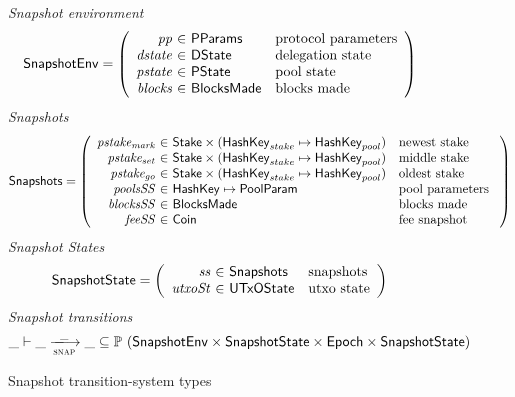 \begin{figure}[htb]
  \emph{Snapshot environment}
  \begin{equation*}
    \SnapshotEnv =
    \left(
      \begin{array}{r@{~\in~}ll}
        \var{pp} & \PParams & \text{protocol parameters}\\
        \var{dstate} & \DState & \text{delegation state}\\
        \var{pstate} & \PState & \text{pool state}\\
        \var{blocks} & \BlocksMade & \text{blocks made}\\
      \end{array}
    \right)
  \end{equation*}
  \emph{Snapshots}
  \begin{equation*}
    \Snapshots =
    \left(
      \begin{array}{r@{~\in~}ll}
        \var{pstake_{mark}} & \Stake\times(\HashKey_{stake}\mapsto\HashKey_{pool})
                            & \text{newest stake}\\
        \var{pstake_{set}} & \Stake\times(\HashKey_{stake}\mapsto\HashKey_{pool})
                           & \text{middle stake}\\
        \var{pstake_{go}} & \Stake\times(\HashKey_{stake}\mapsto\HashKey_{pool})
                          & \text{oldest stake}\\
        \var{poolsSS} & \HashKey \mapsto \PoolParam & \text{pool parameters }\\
        \var{blocksSS} & \BlocksMade & \text{blocks made }\\
        \var{feeSS} & \Coin & \text{fee snapshot}\\
      \end{array}
    \right)
  \end{equation*}
  \emph{Snapshot States}
  \begin{equation*}
    \SnapshotState =
    \left(
      \begin{array}{r@{~\in~}ll}
        \var{ss} & \Snapshots & \text{snapshots}\\
        \var{utxoSt} & \UTxOState & \text{utxo state}\\
      \end{array}
    \right)
  \end{equation*}
  \emph{Snapshot transitions}
  \begin{equation*}
    \_ \vdash
    \var{\_} \trans{snap}{\_} \var{\_}
    \subseteq \powerset (\SnapshotEnv \times \SnapshotState \times \Epoch \times \SnapshotState)
  \end{equation*}
  \caption{Snapshot transition-system types}
  \label{fig:ts-types:snapshot}
\end{figure}

